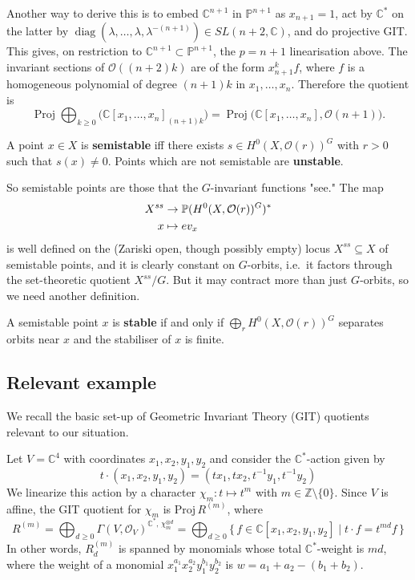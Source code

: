 \documentclass[12pt]{article}
\begin{document}
\begin{example}
  Another way to derive this is to embed $\mathbb{C}^{n+1}$ in $\mathbb{P}^{n+1}$ as
  $x_{n+1}=1$, act by $\mathbb{C}^*$ on the latter by
  $\operatorname{diag}(\lambda,\dots,\lambda,\lambda^{-(n+1)}) \in SL(n+2,\mathbb{C})$,
  and do projective GIT. This gives, on restriction to $\mathbb{C}^{n+1} \subset \mathbb{P}^{n+1}$,
  the $p=n+1$ linearisation above. The invariant sections of $\mathcal{O}((n+2)k)$ are of the form
  $x_{n+1}^k f$, where $f$ is a homogeneous polynomial of degree $(n+1)k$ in $x_1,\dots,x_n$.
  Therefore the quotient is
  \[
    \operatorname{Proj} \bigoplus_{k\ge 0}
    \big(\mathbb{C}[x_1,\dots,x_n]_{(n+1)k}\big) = \operatorname{Proj} \big(\mathbb{C}[x_1,\dots,x_n],\mathcal{O}(n+1)\big).
  \]
\end{example}


\begin{definition}
  A point $x \in X$ is \textbf{semistable} iff there exists
  $s \in H^0(X,\mathcal{O}(r))^G$ with $r>0$ such that $s(x) \neq 0$. Points which are not
  semistable are \textbf{unstable}.
\end{definition}
So semistable points are those that the $G$-invariant functions "see." The map \begin{align*}
  X^{ss} & \to \P(H^0(X,\mathcal{O}(r))^G)^* \\
  x      & \mapsto ev_x
\end{align*} is well defined on the (Zariski open, though possibly empty) locus $X^{ss} \subseteq X$ of semistable points, and it is clearly constant on $G$-orbits,
i.e.~it factors through the set-theoretic quotient $X^{ss}/G$. But it may contract more
than just $G$-orbits, so we need another definition.

\begin{definition}
  A semistable point $x$ is \textbf{stable} if and only if
  $\bigoplus_r H^0(X,\mathcal{O}(r))^G$ separates orbits near $x$ and the stabiliser of $x$ is finite.
\end{definition}




\subsection{Relevant example}
We recall the basic set-up of Geometric Invariant Theory (GIT) quotients relevant to our situation.

Let $V = \mathbb{C}^4$ with coordinates $x_1,x_2,y_1,y_2$ and consider the $\mathbb{C}^*$-action given by
\[
  t\cdot(x_1,x_2,y_1,y_2)=(t x_1, t x_2, t^{-1}y_1, t^{-1}y_2)
\]
We linearize this action by a character $\chi_m:t\mapsto t^m$ with $m\in\mathbb{Z}\setminus\{0\}$. Since $V$ is affine, the GIT quotient for $\chi_m$ is $\mathrm{Proj}\,R^{(m)}$, where
\[
  R^{(m)}=\bigoplus_{d\ge 0} \Gamma(V,\mathcal{O}_V)^{\mathbb{C}^*,\,\chi_m^{\otimes d}}=\bigoplus_{d\ge 0}\{\,f\in\mathbb{C}[x_1,x_2,y_1,y_2]\mid t\cdot f = t^{md} f\,\}
\]
In other words, $R^{(m)}_d$ is spanned by monomials whose total $\mathbb{C}^*$-weight is $md$, where the weight of a monomial $x_1^{a_1}x_2^{a_2}y_1^{b_1}y_2^{b_2}$ is $w=a_1+a_2-(b_1+b_2)$.
\end{document}
